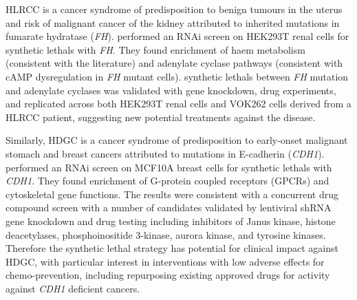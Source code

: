 \gls{HLRCC} is a cancer syndrome of predisposition to benign tumours in the uterus and risk of malignant cancer of the kidney attributed to inherited mutations in fumarate hydratase (\textit{FH}). \citet{Boettcher2014} performed an \gls{RNAi} screen on HEK293T renal cells for \glspl{synthetic lethal} with \textit{FH}. They found enrichment of haem metabolism (consistent with the literature) and adenylate cyclase pathways (consistent with cAMP dysregulation in \textit{FH} mutant cells). \Glspl{synthetic lethal} between \textit{FH} mutation and adenylate cyclases was validated with gene knockdown, drug experiments, and replicated across both HEK293T renal cells and VOK262 cells derived from a HLRCC patient, suggesting new potential treatments against the disease. %

Similarly, \gls{HDGC} is a cancer syndrome of predisposition to early-onset malignant stomach and breast cancers attributed to mutations in \gls{E-cadherin} (\textit{CDH1}). \citet{Telford2015} performed an \gls{RNAi} screen on MCF10A breast cells for \glspl{synthetic lethal} with \textit{CDH1}. They found enrichment of G-protein coupled receptors (GPCRs) and cytoskeletal gene functions. The results were consistent with a concurrent drug compound screen with a number of candidates validated by lentiviral shRNA gene knockdown and drug testing including inhibitors of Janus kinase, histone deacetylases, phosphoinositide 3-kinase, aurora kinase, and tyrosine kinases. Therefore the \gls{synthetic lethal} strategy has potential for clinical impact against \gls{HDGC}, with particular interest in interventions with low adverse effects for chemo-prevention, including repurposing existing approved drugs for activity against \textit{CDH1} deficient cancers.  

